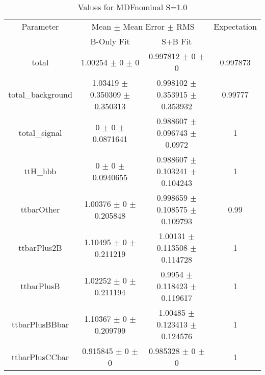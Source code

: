 \begin{table}
\centering
\caption{Values for MDFnominal S=1.0}
\begin{tabular}{cccc}
\toprule
Parameter & \multicolumn{2}{c}{Mean $\pm$ Mean Error $\pm$ RMS} & Expectation\\
 & B-Only Fit & S+B Fit & \\
\midrule
total & \num{1.00254} $\pm$ \num{0} $\pm$ \num{0} & \num{0.997812} $\pm$ \num{0} $\pm$ \num{0} & \num{0.997873}\\
total\_background & \num{1.03419} $\pm$ \num{0.350309} $\pm$ \num{0.350313} & \num{0.998102} $\pm$ \num{0.353915} $\pm$ \num{0.353932} & \num{0.99777}\\
total\_signal & \num{0} $\pm$ \num{0} $\pm$ \num{0.0871641} & \num{0.988607} $\pm$ \num{0.096743} $\pm$ \num{0.0972} & \num{1}\\
ttH\_hbb & \num{0} $\pm$ \num{0} $\pm$ \num{0.0940655} & \num{0.988607} $\pm$ \num{0.103241} $\pm$ \num{0.104243} & \num{1}\\
ttbarOther & \num{1.00376} $\pm$ \num{0} $\pm$ \num{0.205848} & \num{0.998659} $\pm$ \num{0.108575} $\pm$ \num{0.109793} & \num{0.99}\\
ttbarPlus2B & \num{1.10495} $\pm$ \num{0} $\pm$ \num{0.211219} & \num{1.00131} $\pm$ \num{0.113508} $\pm$ \num{0.114728} & \num{1}\\
ttbarPlusB & \num{1.02252} $\pm$ \num{0} $\pm$ \num{0.211194} & \num{0.9954} $\pm$ \num{0.118423} $\pm$ \num{0.119617} & \num{1}\\
ttbarPlusBBbar & \num{1.10367} $\pm$ \num{0} $\pm$ \num{0.209799} & \num{1.00485} $\pm$ \num{0.123413} $\pm$ \num{0.124576} & \num{1}\\
ttbarPlusCCbar & \num{0.915845} $\pm$ \num{0} $\pm$ \num{0} & \num{0.985328} $\pm$ \num{0} $\pm$ \num{0} & \num{1}\\
\bottomrule
\end{tabular}
\end{table}